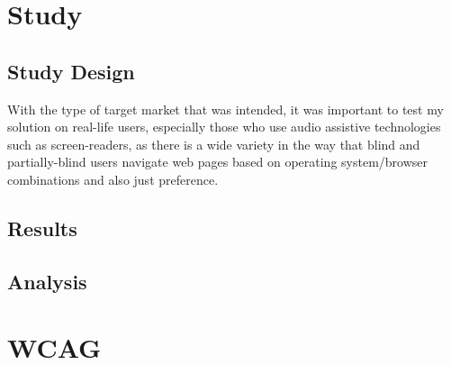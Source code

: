 \documentclass[ %
                    author={Aleena Baig},
                supervisor={Dr Simon Lock},
                    degree={BSc},
                     title={On Making Web Accessible Graphs},
                  subtitle={},
                      year={2019} ]{dissertation}
\begin{document}
\section{Study}

\subsection{Study Design}

With the type of target market that was intended, it was important to test my solution on real-life users, especially those who use audio assistive technologies such as screen-readers, as there is a wide variety in the way that blind and partially-blind users navigate web pages based on operating system/browser combinations and also just preference.


\subsection{Results}

\subsection{Analysis}

\section{WCAG}
\end{document}
